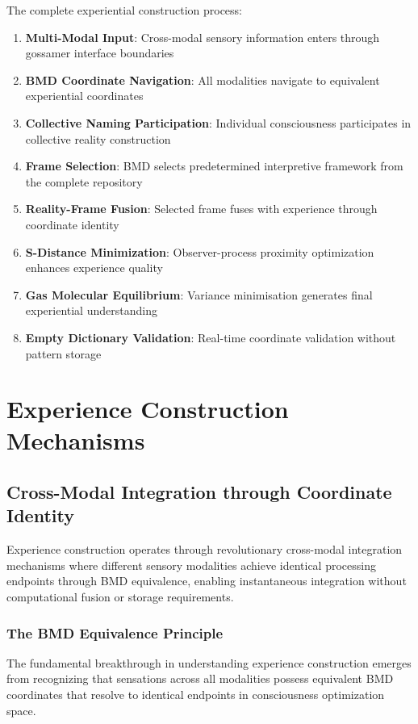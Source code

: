 \documentclass{article}
\begin{document}
The complete experiential construction process:
\begin{enumerate}
\item \textbf{Multi-Modal Input}: Cross-modal sensory information enters through gossamer interface boundaries
\item \textbf{BMD Coordinate Navigation}: All modalities navigate to equivalent experiential coordinates
\item \textbf{Collective Naming Participation}: Individual consciousness participates in collective reality construction
\item \textbf{Frame Selection}: BMD selects predetermined interpretive framework from the complete repository
\item \textbf{Reality-Frame Fusion}: Selected frame fuses with experience through coordinate identity
\item \textbf{S-Distance Minimization}: Observer-process proximity optimization enhances experience quality
\item \textbf{Gas Molecular Equilibrium}: Variance minimisation generates final experiential understanding
\item \textbf{Empty Dictionary Validation}: Real-time coordinate validation without pattern storage
\end{enumerate}

\section{Experience Construction Mechanisms}

\subsection{Cross-Modal Integration through Coordinate Identity}

Experience construction operates through revolutionary cross-modal integration mechanisms where different sensory modalities achieve identical processing endpoints through BMD equivalence, enabling instantaneous integration without computational fusion or storage requirements.

\subsubsection{The BMD Equivalence Principle}

The fundamental breakthrough in understanding experience construction emerges from recognizing that sensations across all modalities possess equivalent BMD coordinates that resolve to identical endpoints in consciousness optimization space.
\end{document}

